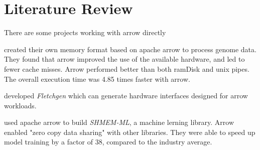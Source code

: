 \chapter{Literature Review}
\label{chapter:Literature}

There are some projects working with arrow directly

\autocite{Ahmad2020}
created their own memory format based on apache arrow to process genome data.
They found that arrow improved the use of the available hardware, and led to fewer cache misses.
Arrow performed better than both ramDisk and unix pipes.
The overall execution time was 4.85 times faster with arrow.


\autocite{Peltenburg2021}
developed \emph{Fletchgen} which can generate hardware interfaces designed for arrow workloads.



\autocite{Grossman2022}
used apache arrow to build \emph{SHMEM-ML}, a machine lerning library.
Arrow enabled "zero copy data sharing" with other libraries.
They were able to speed up model training by a factor of 38, compared to the industry average.



